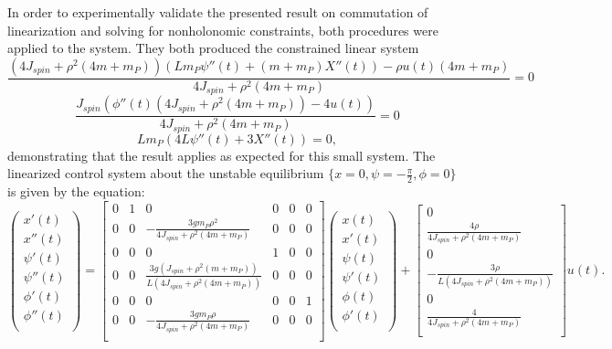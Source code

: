 In order to experimentally validate the presented result on commutation of linearization and solving for nonholonomic constraints, both procedures were applied to the system. 
They both produced the constrained linear system
\begin{equation}
	\frac{\left(4 J_{spin}+\rho ^2 (4 m+m_{P})\right)
   \left(L m_{P} \psi ''(t)+(m+m_{P}) X''(t)\right)-\rho 
   u(t) (4 m+m_{P})}{4 J_{spin}+\rho ^2 (4
   m+m_{P})}=0
\end{equation}
\begin{equation}
	\frac{J_{spin} \left(\phi ''(t) \left(4
   J_{spin}+\rho ^2 (4 m+m_{P})\right)-4 u(t)\right)}{4
   J_{spin}+\rho ^2 (4 m+m_{P})}=0
\end{equation}
\begin{equation}
	L m_{P} \left(4 L
   \psi ''(t)+3 X''(t)\right)=0,
\end{equation}
demonstrating that the result applies as expected for this small system. The linearized control system about the unstable equilibrium $\{x=0,\psi=-\frac{\pi}{2},\phi=0\}$ is given by the equation:
\begin{equation}
\left(
\begin{array}{c}
 x'(t) \\
 x''(t) \\
 \psi'(t) \\
 \psi''(t) \\
 \phi'(t) \\
 \phi''(t) \\
\end{array}
\right)
=
\left[
\begin{array}{cccccc}
 0 & 1 & 0 & 0 & 0 & 0 \\
 0 & 0 & -\frac{3 g m_{P} \rho ^2}{4 J_{spin}+\rho ^2 (4
   m+m_{P})} & 0 & 0 & 0 \\
 0 & 0 & 0 & 1 & 0 & 0 \\
 0 & 0 & \frac{3 g \left(J_{spin}+\rho ^2
   (m+m_{P})\right)}{L \left(4 J_{spin}+\rho ^2 (4
   m+m_{P})\right)} & 0 & 0 & 0 \\
 0 & 0 & 0 & 0 & 0 & 1 \\
 0 & 0 & -\frac{3 g m_{P} \rho }{4 J_{spin}+\rho ^2 (4
   m+m_{P})} & 0 & 0 & 0 \\
\end{array}
\right]
\left(
\begin{array}{c}
 x(t) \\
 x'(t) \\
 \psi(t) \\
 \psi'(t) \\
 \phi(t) \\
 \phi'(t) \\
\end{array}
\right)
+
\left[
\begin{array}{c}
 0 \\
 \frac{4 \rho }{4 J_{spin}+\rho ^2 (4 m+m_{P})} \\
 0 \\
 -\frac{3 \rho }{L \left(4 J_{spin}+\rho ^2 (4
   m+m_{P})\right)} \\
 0 \\
 \frac{4}{4 J_{spin}+\rho ^2 (4 m+m_{P})} \\
\end{array}
\right]u(t).
\end{equation}
